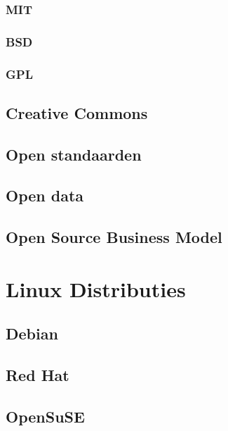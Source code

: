 \documentclass[a4paper,12pt,twoside,openright,titlepage]{book}
\begin{document}
\subsection{MIT}

\subsection{BSD}

\subsection{GPL}

\section{Creative Commons}

\section{Open standaarden}

\section{Open data}

\section{Open Source Business Model}


\chapter{Linux Distributies}

\section{Debian}

\section{Red Hat}

\section{OpenSuSE}


\backmatter
\printindex
\end{document}
